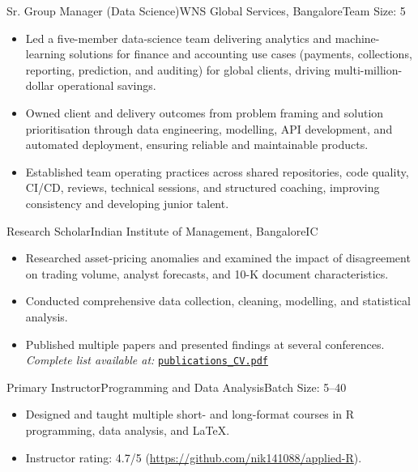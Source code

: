 \documentclass[11pt,a4paper]{moderncv}
\begin{document}
    {Sr. Group Manager (Data Science)}{WNS Global Services, Bangalore}{}{Team Size: 5}{
    \begin{itemize}
        \item Led a five-member data-science team delivering analytics and machine-learning solutions for finance and accounting use cases (payments, collections, reporting, prediction, and auditing) for global clients, driving multi-million-dollar operational savings.
        \item Owned client and delivery outcomes from problem framing and solution prioritisation through data engineering, modelling, API development, and automated deployment, ensuring reliable and maintainable products.
        \item Established team operating practices across shared repositories, code quality, CI/CD, reviews, technical sessions, and structured coaching, improving consistency and developing junior talent.
    \end{itemize}
    }

    {Research Scholar}{Indian Institute of Management, Bangalore}{}{IC}{
    \begin{itemize}
        \item Researched asset-pricing anomalies and examined the impact of disagreement on trading volume, analyst forecasts, and 10-K document characteristics.
        \item Conducted comprehensive data collection, cleaning, modelling, and statistical analysis.
        \item Published multiple papers and presented findings at several conferences. \textit{Complete list available at:}
\href{https://github.com/nik141088/CV/blob/main/publications_CV.pdf}{\texttt{publications\_CV.pdf}}
    \end{itemize}
    }

    {Primary Instructor}{Programming and Data Analysis}{}{Batch Size: 5--40}{
    \begin{itemize}
        \item Designed and taught multiple short- and long-format courses in R programming, data analysis, and LaTeX.
        \item Instructor rating: 4.7/5 (\href{https://github.com/nik141088/applied-R}{https://github.com/nik141088/applied-R}).
    \end{itemize}
    }
\end{document}
